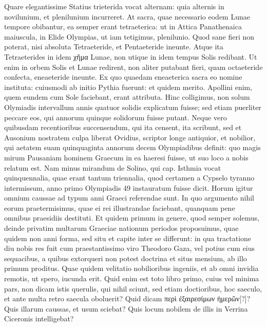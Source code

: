Quare elegantissime Statius trieterida vocat alternam:
quia alternis in novilunium, et plenilunium incurreret.
At sacra,
quae necessario eodem Lunae tempore obibantur, ea semper erant
tetraeterica: ut in Attica Panathenaica maiuscula, in Elide Olympias,
ut iam tetigimus, plenilunio.
Quod sane fieri non poterat, nisi absoluta
Tetraeteride, et Pentaeteride ineunte.
Atque ita Tetraeterides
in idem \textgreek{χῆμα} Lunae, non utique in idem tempus Solis redibant.
Ut
enim in orbem Solis et Lunae redirent, non aliter putabant fieri,
quam octaeteride confecta, eneaeteride ineunte.
Ex quo quaedam
eneaeterica sacra eo nomine instituta: cuiusmodi ab initio Pythia
fuerunt: et quidem merito.
Apollini enim, quem eundem cum Sole
faciebant, erant attributa.
Hinc colligimus, non solum Olymiadis
intervallum annis quatuor solidis explicatum fuisse; sed etiam puerliter
peccare eos, qui annorum quinque solidorum fuisse putant.
Neque vero quibusdam recentioribus succensendum, qui ita censent,
ita scribunt, sed et Ausonium nostratem culpa liberat Ovidius, scriptor
longe antiquior, et nobilior, qui aetatem suam quinquaginta annorum
decem Olympiadibus definit: quo magis mirum Pausaniam
hominem Graecum in ea haeresi fuisse, ut suo loco a nobis relatum est.
%
Nam minus mirandum de Solino, qui cap. 
 Isthmia vocat
quinquennalia, quae erant tantum triennalia, quod certamen a Cypselo
tyranno intermissum, anno primo Olympiadis 49 instauratum
fuisse dicit.
Horum igitur omnium caussae ad typum anni Graeci referendae
sunt.
In quo argumento nihil eorum praetermisimus, quae
ei rei illustrandae faciebant, quanquam pene omnibus praesidiis
destituti.
Et quidem primum in genere, quod semper solemus, deinde
privatim multarum Graeciae nationum periodos proposuimus,
quae quidem non anni forma, sed situ et capite inter se differunt: in
qua tractatione diu nobis res fuit cum praestantissimo viro Theodoro
Gaza, vel potius cum eius sequacibus, a quibus extorqueri non
potest doctrina et situs mensium, ab illo primum proditus. 
Quae quidem
velitatio nobilioribus ingeniis, et ab omni invidia remotis, ut
spero, iucunda erit.
Quid enim est toto libro primo, cuius vel minima
pars, non dicam istis querulis, qui nihil sciunt, sed etiam doctioribus,
hoc saeculo, et ante multa retro saecula oboluerit?
Quid dicam
 \textgreek{περὶ ἐξαιρεσίμων ἡμερῶν[?]}?
Quis illarum caussas, et usum sciebat?
Quis
locum nobilem de illis in Verrina Ciceronis intelligebat?
